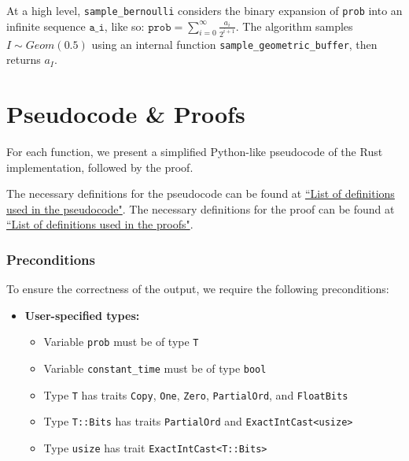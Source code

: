 \documentclass[11pt,a4paper]{article}
\newcommand{\vicki}[1]{{ {\color{olive}{(vicki)~#1}}}}
\theoremstyle{definition}
\begin{document}

At a high level, \texttt{sample\_bernoulli} considers the binary expansion of \texttt{prob} into an infinite sequence $\texttt{a\_i}$, like so: $\texttt{prob} = \sum_{i = 0}^{\infty} \frac{a_i}{2^{i + 1}}$. The algorithm samples $I \sim Geom(0.5)$ using an internal function \texttt{sample\_geometric\_buffer}, then returns $a_I$. 

\section{Pseudocode \& Proofs}
For each function, we present a simplified Python-like pseudocode of the Rust implementation, followed by the proof. \vicki{later when we make this modular (i.e. sorted into functions relating to bernoulli, functions relating to geometric, etc.), each function will be a separate theorem.}

The necessary definitions for the pseudocode can be found at \href{https://github.com/opendp/whitepapers/blob/pseudocode-defns/pseudocode-defns/pseudocode_defns.pdf}{``List of definitions used in the pseudocode"}. The necessary definitions for the proof can be found at \href{https://github.com/opendp/whitepapers/blob/proof-defns/proof-defns/proof_defns.pdf}{``List of definitions used in the proofs"}. \vicki{need to fix these links} 

\subsubsection*{Preconditions}
To ensure the correctness of the output, we require the following preconditions:

\begin{itemize}
    \item \textbf{User-specified types:}
    \begin{itemize}
        \item Variable \texttt{prob} must be of type \texttt{T}
        \item Variable \texttt{constant\_time} must be of type \texttt{bool}
        \item Type \texttt{T} has traits \texttt{Copy}, \texttt{One}, \texttt{Zero}, \texttt{PartialOrd}, and \texttt{FloatBits}
        \item Type \texttt{T::Bits} has traits \texttt{PartialOrd} and \texttt{ExactIntCast<usize>}
        \item Type \texttt{usize} has trait \texttt{ExactIntCast<T::Bits>}
    \end{itemize}
\end{itemize}
\end{document}
